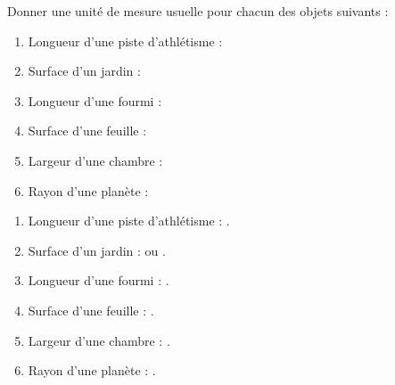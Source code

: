 \begin{Maquette}[Fiche,CorrigeFin,Colonnes=2]{}
\begin{multicols}{2}
         
         \begin{exercice}[SLF] %
            Donner une unité de mesure usuelle pour chacun des objets suivants :
            \begin{enumerate}
               \item Longueur d'une piste d'athlétisme : \pointilles
               \item Surface d'un jardin : \pointilles
               \item Longueur d'une fourmi : \pointilles
               \item Surface d'une feuille : \pointilles
               \item Largeur d'une chambre : \pointilles
               \item Rayon d'une planète : \pointilles
            \end{enumerate}
         \end{exercice}
         
         \begin{Solution}
            \begin{enumerate}
               \item Longueur d'une piste d'athlétisme : .
               \item Surface d'un jardin :  ou .
               \item Longueur d'une fourmi : .
               \item Surface d'une feuille : .
               \item Largeur d'une chambre : .
               \item Rayon d'une planète : .
            \end{enumerate}
         \end{Solution}


\end{multicols}
\end{Maquette}
